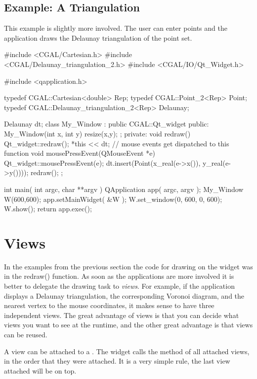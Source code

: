 \subsection{Example: A Triangulation}

This example is slightly more involved. The user can enter points and the application
draws the Delaunay triangulation of the point set. 

\begin{ccExampleCode}
#include <CGAL/Cartesian.h>
#include <CGAL/Delaunay_triangulation_2.h>
#include <CGAL/IO/Qt_Widget.h>

#include <qapplication.h>

typedef CGAL::Cartesian<double>		    Rep;
typedef CGAL::Point_2<Rep>		    Point;
typedef CGAL::Delaunay_triangulation_2<Rep> Delaunay;

Delaunay dt;
class My_Window : public CGAL::Qt_widget {
public:
  My_Window(int x, int y){ resize(x,y); };
private:
  void redraw()
  {
    Qt_widget::redraw();
    *this << dt;
  }  
  // mouse events get dispatched to this function
  void mousePressEvent(QMouseEvent *e)
  {
    Qt_widget::mousePressEvent(e);
    dt.insert(Point(x_real(e->x()), y_real(e->y())));
    redraw();
  }
};

int main( int argc, char **argv )
{
    QApplication app( argc, argv );
    My_Window W(600,600);
    app.setMainWidget( &W );
    W.set_window(0, 600, 0, 600);
    W.show();
    return app.exec();
}
\end{ccExampleCode}



\section{Views}
\label{Qt_widget_views}

In the examples from the previous section the code for drawing on the
widget was in the redraw() function. As soon as the applications are more 
involved it is better to delegate the drawing task to {\em views}. 
For example, if the application displays a Delaunay triangulation, the corresponding Voronoi diagram, and the nearest vertex to the mouse coordinates, it 
makes
sense to have three independent views. The great advantage of views is that you
 can decide what views you want to see at the runtime, and the other great 
advantage is that views can be reused.

A view can be attached to a . The widget calls the method  of all attached views, in the order 
that they were attached. It is a very simple rule, the last view attached will 
be on top.

